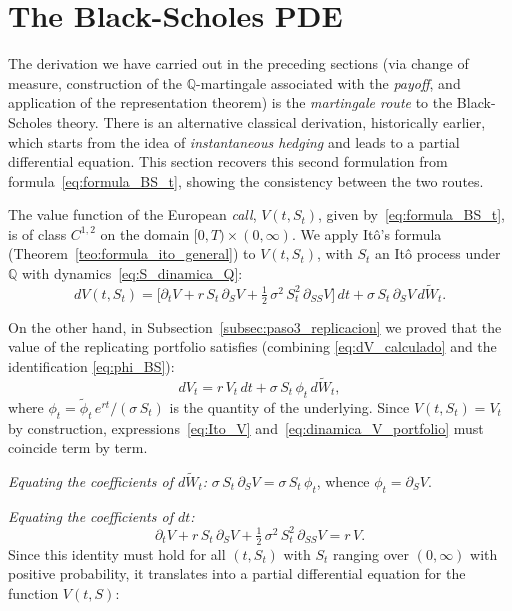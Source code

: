 \documentclass[11pt,a4paper,oneside]{report}
\theoremstyle{plain}
\theoremstyle{definition}
\theoremstyle{remark}
\newcommand{\Q}{\mathbb{Q}}
\newcommand{\1}{\mathbf{1}}
\begin{document}
\section{The Black-Scholes PDE}
\label{sec:edp_bs}

The derivation we have carried out in the preceding sections (via
change of measure, construction of the $\Q$-martingale associated
with the \emph{payoff}, and application of the representation
theorem) is the \emph{martingale route} to the Black-Scholes theory.
There is an alternative classical derivation, historically earlier,
which starts from the idea of \emph{instantaneous hedging} and leads
to a partial differential equation. This section recovers this
second formulation from formula~\eqref{eq:formula_BS_t}, showing the
consistency between the two routes.

The
value function of the European \emph{call}, $V(t, S_t)$, given
by~\eqref{eq:formula_BS_t}, is of class $C^{1,2}$ on the domain
$[0, T) \times (0, \infty)$. We apply Itô's formula
(Theorem~\ref{teo:formula_ito_general}) to $V(t, S_t)$, with $S_t$
an Itô process under $\Q$ with dynamics~\eqref{eq:S_dinamica_Q}:
\begin{equation}\label{eq:Ito_V}
  dV(t, S_t)
  = \biggl[\partial_t V + r\, S_t\, \partial_S V
           + \tfrac{1}{2}\, \sigma^2\, S_t^2\, \partial_{SS} V\biggr]\, dt
   + \sigma\, S_t\, \partial_S V\, d\widetilde W_t.
\end{equation}

On the other hand, in
Subsection~\ref{subsec:paso3_replicacion} we proved that the value
of the replicating portfolio satisfies (combining
\eqref{eq:dV_calculado} and the identification \eqref{eq:phi_BS}):
\begin{equation}\label{eq:dinamica_V_portfolio}
  dV_t = r\, V_t\, dt + \sigma\, S_t\, \phi_t\, d\widetilde W_t,
\end{equation}
where $\phi_t = \widetilde\phi_t\, e^{rt} / (\sigma\, S_t)$ is the
quantity of the underlying. Since $V(t, S_t) = V_t$ by construction,
expressions~\eqref{eq:Ito_V} and~\eqref{eq:dinamica_V_portfolio}
must coincide term by term.

\emph{Equating the coefficients of $d\widetilde W_t$:}
$\sigma\, S_t\, \partial_S V = \sigma\, S_t\, \phi_t$, whence
$\phi_t = \partial_S V$.

\emph{Equating the coefficients of $dt$:}
\begin{equation*}
  \partial_t V + r\, S_t\, \partial_S V
  + \tfrac{1}{2}\, \sigma^2\, S_t^2\, \partial_{SS} V
  = r\, V.
\end{equation*}
Since this identity must hold for all $(t, S_t)$ with $S_t$ ranging
over $(0, \infty)$ with positive probability, it translates into a
partial differential equation for the function $V(t, S)$:
\end{document}
